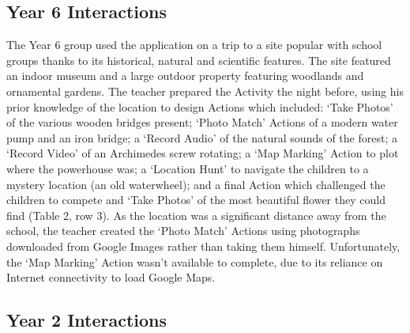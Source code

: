 \subsection{Year 6 Interactions}

The Year 6 group used the application on a trip to a site popular with school
groups thanks to its historical, natural and scientific features. The site
featured an indoor museum and a large outdoor property featuring woodlands and
ornamental gardens. The teacher prepared the Activity the night before, using
his prior knowledge of the location to design Actions which included: ‘Take
Photos’ of the various wooden bridges present; ‘Photo Match’ Actions of a modern
water pump and an iron bridge; a ‘Record Audio’ of the natural sounds of the
forest; a ‘Record Video’ of an Archimedes screw rotating; a ‘Map Marking’ Action
to plot where the powerhouse was; a ‘Location Hunt’ to navigate the children to
a mystery location (an old waterwheel); and a final Action which challenged the
children to compete and ‘Take Photos’ of the most beautiful flower they could
find (Table 2, row 3). As the location was a significant distance away from the
school, the teacher created the ‘Photo Match’ Actions using photographs
downloaded from Google Images rather than taking them himself. Unfortunately,
the ‘Map Marking’ Action wasn’t available to complete, due to its reliance on
Internet connectivity to load Google Maps.

\subsection{Year 2 Interactions}

